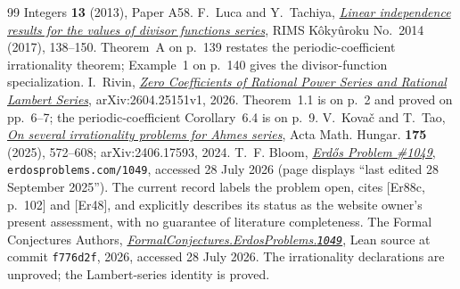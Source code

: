 \documentclass[11pt]{article}
\begin{document}
\begin{thebibliography}{99}
  Integers \textbf{13} (2013), Paper A58.
 F.~Luca and Y.~Tachiya,
  \href{https://www.kurims.kyoto-u.ac.jp/~kyodo/kokyuroku/contents/pdf/2014-14.pdf}
  {\emph{Linear independence results for the values of divisor functions
  series}}, RIMS K\^oky\^uroku No.~2014 (2017), 138--150.
  Theorem~A on p.~139 restates the periodic-coefficient irrationality theorem;
  Example~1 on p.~140 gives the divisor-function specialization.
 I.~Rivin,
\href{https://arxiv.org/abs/2604.25151}{\emph{Zero Coefficients of Rational
  Power Series and Rational Lambert Series}}, arXiv:2604.25151v1, 2026.
  Theorem~1.1 is on p.~2 and proved on pp.~6--7; the periodic-coefficient
  Corollary~6.4 is on p.~9.
 V.~Kova\v{c} and T.~Tao,
  \href{https://arxiv.org/abs/2406.17593}{\emph{On several irrationality
  problems for Ahmes series}}, Acta Math. Hungar. \textbf{175} (2025),
  572--608; arXiv:2406.17593, 2024.
 T.~F. Bloom,
  \href{https://www.erdosproblems.com/1049}{\emph{Erd\H{o}s Problem \#1049}},
  \texttt{erdosproblems.com/1049}, accessed 28 July 2026
  (page displays ``last edited 28 September 2025'').  The current record
  labels the problem open, cites \textup{[Er88c, p.~102]} and \textup{[Er48]},
  and explicitly describes its status as the website owner's present
  assessment, with no guarantee of literature completeness.
 The Formal Conjectures Authors,
  \href{https://github.com/google-deepmind/formal-conjectures/blob/f776d2f2039351b00737ffcafb9d7d7666e1d9af/FormalConjectures/ErdosProblems/1049.lean}
  {\emph{FormalConjectures.ErdosProblems.\texttt{1049}}},
  Lean source at commit \texttt{f776d2f}, 2026, accessed 28 July 2026.  The
  irrationality declarations are unproved; the Lambert-series identity is
  proved.
\end{thebibliography}
\end{document}
